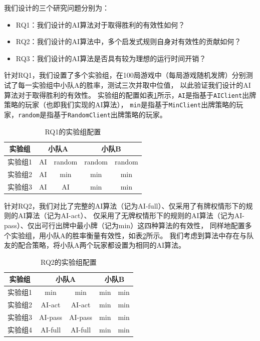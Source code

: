 \documentclass[a4paper]{ctexart}
\begin{document}
我们设计的三个研究问题分别为：
\begin{itemize}
	\item RQ1：我们设计的AI算法对于取得胜利的有效性如何？
	\item RQ2：我们设计的AI算法中，多个启发式规则自身对有效性的贡献如何？
	\item RQ3：我们设计的AI算法是否具有较为理想的运行时间开销？
\end{itemize}

针对RQ1，我们设置了多个实验组，在100局游戏中（每局游戏随机发牌）分别测试了每一实验组中小队A的胜率，测试三次并取中位值，
以此验证我们设计的AI算法对于取得胜利的有效性。
实验组的配置如表\ref{RQ1_config}所示，\texttt{AI}是指基于\texttt{AIClient}出牌策略的玩家（也即我们实现的AI算法），
\texttt{min}是指基于\texttt{MinClient}出牌策略的玩家，\texttt{random}是指基于\texttt{RandomClient}出牌策略的玩家。

\begin{table}
	\centering 
	\caption{RQ1的实验组配置}
	\label{RQ1_config}
	\begin{tabular}{|c|c|c|c|c|}
		\hline
		实验组   & \multicolumn{2}{c|}{小队A} & \multicolumn{2}{c|}{小队B} \\ \hline
		实验组1 & AI & random & random & random \\ \hline
		实验组2 & AI & min & min & min \\ \hline
		实验组3 & AI & AI & min & min \\ \hline
	\end{tabular}
\end{table}

针对RQ2，我们对比了完整的AI算法（记为AI-full）、仅采用了有牌权情形下的规则的AI算法（记为AI-act）、
仅采用了无牌权情形下的规则的AI算法（记为AI-pass）、仅出可行出牌中最小牌（记为min）这四种算法的有效性，
同样地配置多个实验组，用小队A的胜率衡量有效性，如表\ref{RQ2_config}所示。
我们考虑到算法中存在与队友的配合策略，将小队A两个玩家都设置为相同的AI算法。

\begin{table}
	\centering 
	\caption{RQ2的实验组配置}
	\label{RQ2_config}
	\begin{tabular}{|c|c|c|c|c|}
		\hline
		实验组   & \multicolumn{2}{c|}{小队A} & \multicolumn{2}{c|}{小队B} \\ \hline
		实验组1 & min & min & min & min \\ \hline
		实验组2 & AI-act & AI-act & min & min \\ \hline
		实验组3 & AI-pass & AI-pass & min & min \\ \hline
		实验组4 & AI-full & AI-full & min & min \\ \hline
	\end{tabular}
\end{table}
\end{document}
